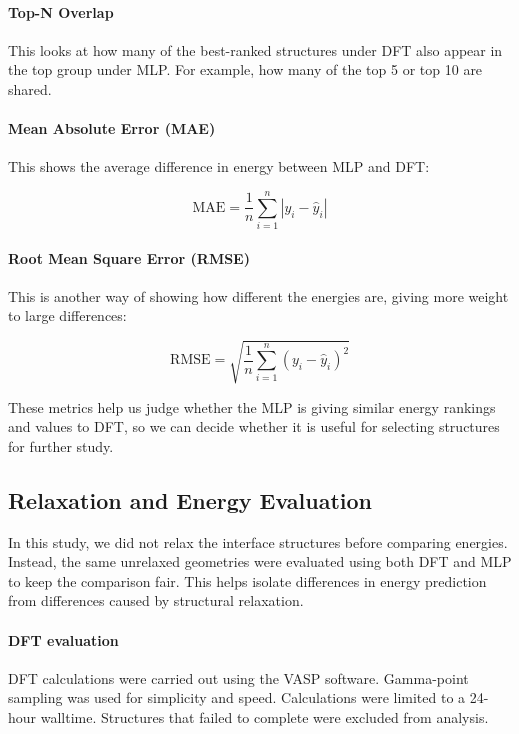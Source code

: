 \paragraph{Top-N Overlap}

This looks at how many of the best-ranked structures under DFT also appear in the top group under MLP. For example, how many of the top 5 or top 10 are shared.

\paragraph{Mean Absolute Error (MAE)}

This shows the average difference in energy between MLP and DFT:

\[
\text{MAE} = \frac{1}{n} \sum_{i=1}^{n} |y_i - \hat{y}_i|
\]

\paragraph{Root Mean Square Error (RMSE)}

This is another way of showing how different the energies are, giving more weight to large differences:

\[
\text{RMSE} = \sqrt{\frac{1}{n} \sum_{i=1}^{n} (y_i - \hat{y}_i)^2}
\]

These metrics help us judge whether the MLP is giving similar energy rankings and values to DFT, so we can decide whether it is useful for selecting structures for further study.

\subsection{Relaxation and Energy Evaluation}

In this study, we did not relax the interface structures before comparing energies. Instead, the same unrelaxed geometries were evaluated using both DFT and MLP to keep the comparison fair. This helps isolate differences in energy prediction from differences caused by structural relaxation.

\paragraph{DFT evaluation}

DFT calculations were carried out using the VASP software. Gamma-point sampling was used for simplicity and speed. Calculations were limited to a 24-hour walltime. Structures that failed to complete were excluded from analysis.

